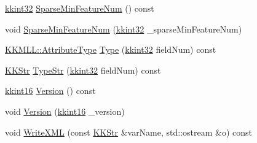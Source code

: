 \begin{DoxyCompactItemize}
\item 
\hyperlink{namespace_k_k_b_a8fa4952cc84fda1de4bec1fbdd8d5b1b}{kkint32} \hyperlink{class_k_k_m_l_l_1_1_file_desc_a5544aa7b42d2486b09b1dcfa08837367}{Sparse\+Min\+Feature\+Num} () const 
\item 
void \hyperlink{class_k_k_m_l_l_1_1_file_desc_a3eb52197b1740dc1e168eaaff0be6047}{Sparse\+Min\+Feature\+Num} (\hyperlink{namespace_k_k_b_a8fa4952cc84fda1de4bec1fbdd8d5b1b}{kkint32} \+\_\+sparse\+Min\+Feature\+Num)
\item 
\hyperlink{namespace_k_k_m_l_l_a99973706982b59debba670e2480555ab}{K\+K\+M\+L\+L\+::\+Attribute\+Type} \hyperlink{class_k_k_m_l_l_1_1_file_desc_a4d84c65489e2ac36e91cb1d8a34adb89}{Type} (\hyperlink{namespace_k_k_b_a8fa4952cc84fda1de4bec1fbdd8d5b1b}{kkint32} field\+Num) const 
\item 
\hyperlink{class_k_k_b_1_1_k_k_str}{K\+K\+Str} \hyperlink{class_k_k_m_l_l_1_1_file_desc_aab158079a610de24575b40389d7f098c}{Type\+Str} (\hyperlink{namespace_k_k_b_a8fa4952cc84fda1de4bec1fbdd8d5b1b}{kkint32} field\+Num) const 
\item 
\hyperlink{namespace_k_k_b_a93809780ee294124dda4c23069f41248}{kkint16} \hyperlink{class_k_k_m_l_l_1_1_file_desc_aff599179bf3e386c5da240117386da12}{Version} () const 
\item 
void \hyperlink{class_k_k_m_l_l_1_1_file_desc_a8d8f74c11a01f1400c0bac5fa79b2456}{Version} (\hyperlink{namespace_k_k_b_a93809780ee294124dda4c23069f41248}{kkint16} \+\_\+version)
\item 
void \hyperlink{class_k_k_m_l_l_1_1_file_desc_a52dd5520a36027eef50b4d7a613b6fba}{Write\+X\+ML} (const \hyperlink{class_k_k_b_1_1_k_k_str}{K\+K\+Str} \&var\+Name, std\+::ostream \&o) const 
\end{DoxyCompactItemize}
